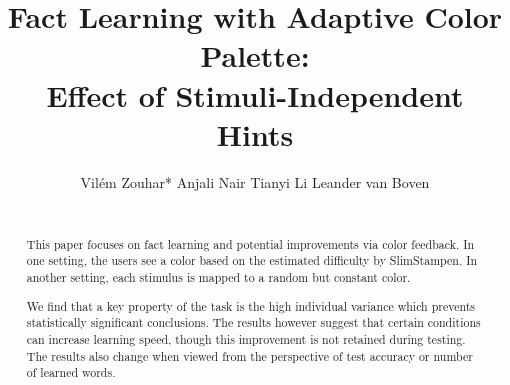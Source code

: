 \documentclass{sigchi}
\begin{document}
\title{Fact Learning with Adaptive Color Palette:\\ Effect of Stimuli-Independent Hints}

\author{
  Vilém Zouhar* \qquad
  Anjali Nair  \qquad
  Tianyi Li \qquad
  Leander van Boven \\
   \\
}

\maketitle

\begin{abstract}
This paper focuses on fact learning and potential improvements via color feedback.
In one setting, the users see a color based on the estimated difficulty by SlimStampen.
In another setting, each stimulus is mapped to a random but constant color.

We find that a key property of the task is the high individual variance which prevents statistically significant conclusions.
The results however suggest that certain conditions can increase learning speed, though this improvement is not retained during testing.
The results also change when viewed from the perspective of test accuracy or number of learned words. 
\end{abstract}

\vspace{-0.1cm}

\end{document}
